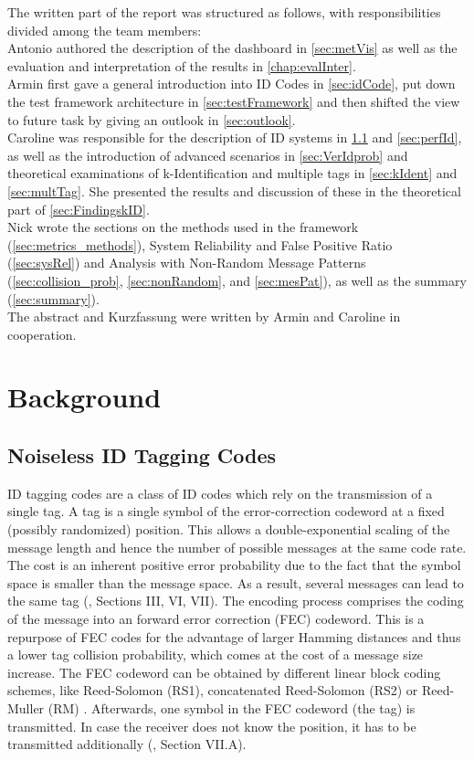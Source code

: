 \documentclass[english,BCOR=4mm,cdfont=false]{tudscrreprt} %
\begin{document}
The written part of the report was structured as follows, with responsibilities divided among the team members:\\
Antonio authored the description of the dashboard in \ref{sec:metVis} as well as the evaluation and interpretation of the results in \ref{chap:evalInter}.\\
Armin first gave a general introduction into ID Codes in \ref{sec:idCode}, put down the test framework architecture in \ref{sec:testFramework} and then shifted the view to future task by giving an outlook in \ref{sec:outlook}.\\
Caroline was responsible for the description of ID systems in \ref{sec:backgroundIdCodes} and \ref{sec:perfId}, as well as the introduction of advanced scenarios in \ref{sec:VerIdprob} and theoretical examinations of k-Identification and multiple tags in \ref{sec:kIdent} and \ref{sec:multTag}. She presented the results and discussion of these in the theoretical part of \ref{sec:FindingskID}.\\
Nick wrote the sections on the methods used in the framework (\ref{sec:metrics_methods}), System Reliability and False Positive Ratio (\ref{sec:sysRel}) and Analysis with Non-Random Message Patterns (\ref{sec:collision_prob}, \ref{sec:nonRandom}, and \ref{sec:mesPat}), as well as the summary (\ref{sec:summary}).\\
The abstract and Kurzfassung were written by Armin and Caroline in cooperation.


\chapter{Background}

\section{Noiseless ID Tagging Codes}
\label{sec:backgroundIdCodes}
ID tagging codes are a class of ID codes which rely on the transmission of a single tag. A tag is a single symbol of the error-correction codeword at a fixed (possibly randomized) position. This allows a double-exponential scaling of the message length and hence the number of possible messages at the same code rate. The cost is an inherent positive error probability due to the fact that the symbol space is smaller than the message space. As a result, several messages can lead to the same tag (\cite{Codes_for_ID_Tutorial}, Sections III, VI, VII). 
The encoding process comprises the coding of the message into an forward error correction (FEC) codeword. This is a repurpose of FEC codes for the advantage of larger Hamming distances and thus a lower tag collision probability, which comes at the cost of a message size increase.
The FEC codeword can be obtained by different linear block coding schemes, like Reed-Solomon (RS1), concatenated Reed-Solomon (RS2) or Reed-Muller (RM) \cite{ID_Codes_Topical_Review}. 
Afterwards, one symbol in the FEC codeword (the tag) is transmitted. In case the receiver does not know the position, it has to be transmitted additionally (\cite{Codes_for_ID_Tutorial}, Section VII.A).
\end{document}
